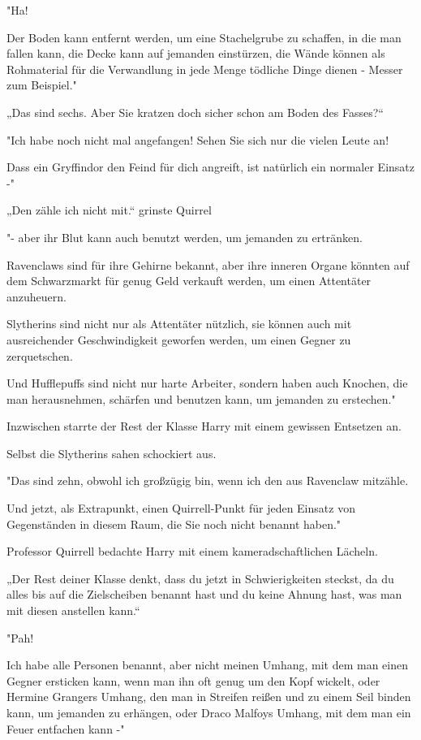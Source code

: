 {"Ha!

Der Boden kann entfernt werden, um eine Stachelgrube zu schaffen, in die man fallen kann, die Decke kann auf jemanden einstürzen, die Wände können als Rohmaterial für die Verwandlung in jede Menge tödliche Dinge dienen - Messer zum Beispiel."

„Das sind sechs. Aber Sie kratzen doch sicher schon am Boden des Fasses?“

"Ich habe noch nicht mal angefangen! Sehen Sie sich nur die vielen Leute an!

Dass ein Gryffindor den Feind für dich angreift, ist natürlich ein normaler Einsatz -"

„Den zähle ich nicht mit.“ grinste Quirrel

"- aber ihr Blut kann auch benutzt werden, um jemanden zu ertränken.

Ravenclaws sind für ihre Gehirne bekannt, aber ihre inneren Organe könnten auf dem Schwarzmarkt für genug Geld verkauft werden, um einen Attentäter anzuheuern.

Slytherins sind nicht nur als Attentäter nützlich, sie können auch mit ausreichender Geschwindigkeit geworfen werden, um einen Gegner zu zerquetschen.

Und Hufflepuffs sind nicht nur harte Arbeiter, sondern haben auch Knochen, die man herausnehmen, schärfen und benutzen kann, um jemanden zu erstechen."

Inzwischen starrte der Rest der Klasse Harry mit einem gewissen Entsetzen an.

Selbst die Slytherins sahen schockiert aus.

"Das sind zehn, obwohl ich großzügig bin, wenn ich den aus Ravenclaw mitzähle.

Und jetzt, als Extrapunkt, einen Quirrell-Punkt für jeden Einsatz von Gegenständen in diesem Raum, die Sie noch nicht benannt haben."

Professor Quirrell bedachte Harry mit einem kameradschaftlichen Lächeln.

„Der Rest deiner Klasse denkt, dass du jetzt in Schwierigkeiten steckst, da du alles bis auf die Zielscheiben benannt hast und du keine Ahnung hast, was man mit diesen anstellen kann.“

"Pah!

Ich habe alle Personen benannt, aber nicht meinen Umhang, mit dem man einen Gegner ersticken kann, wenn man ihn oft genug um den Kopf wickelt, oder Hermine Grangers Umhang, den man in Streifen reißen und zu einem Seil binden kann, um jemanden zu erhängen, oder Draco Malfoys Umhang, mit dem man ein Feuer entfachen kann -"

}
